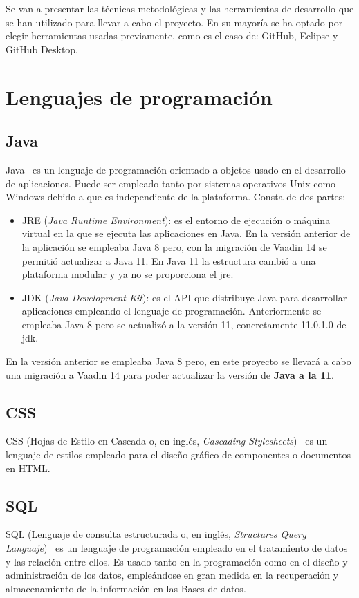
Se van a presentar las técnicas metodológicas y las herramientas de desarrollo que se han utilizado para llevar a cabo el proyecto. En su mayoría se ha optado por elegir herramientas usadas previamente, como es el caso de: GitHub, Eclipse y GitHub Desktop.

\section{Lenguajes de programación}

\subsection{Java}
Java~\cite{pagina_java} es un lenguaje de programación orientado a objetos usado en el desarrollo de aplicaciones. Puede ser empleado tanto por sistemas operativos Unix como Windows debido a que es independiente de la plataforma. 
Consta de dos partes: 
\begin{itemize}
	\tightlist
	\item JRE (\emph{Java Runtime Environment}): es el entorno de ejecución o máquina virtual en la que se ejecuta las aplicaciones en Java. En la versión anterior de la aplicación se empleaba Java 8 pero, con la migración de Vaadin 14 se permitió actualizar a Java 11. En Java 11 la estructura cambió a una plataforma modular y ya no se proporciona el jre. 
	\item JDK (\emph{Java Development Kit}): es el API que distribuye Java para desarrollar aplicaciones empleando el lenguaje de programación. Anteriormente se empleaba Java 8 pero se actualizó a la versión 11, concretamente 11.0.1.0 de jdk. 
\end{itemize}

En la versión anterior se empleaba Java 8 pero, en este proyecto se llevará a cabo una migración a Vaadin 14 para poder actualizar la versión de \textbf{Java a la 11}.

\subsection{CSS}
CSS (Hojas de Estilo en Cascada o, en inglés, \emph{Cascading Stylesheets})~\cite{pagina_css} es un lenguaje de estilos empleado para el diseño gráfico de componentes o documentos en HTML.

\subsection{SQL}
SQL (Lenguaje de consulta estructurada o, en inglés, \emph{Structures Query Languaje})~\cite{pagina_sql} es un lenguaje de programación empleado en el tratamiento de datos y las relación entre ellos. Es usado tanto en la programación como en el diseño y administración de los datos, empleándose en gran medida en la recuperación y almacenamiento de la información en las Bases de datos.

